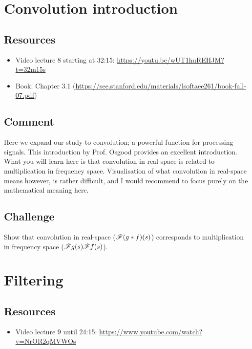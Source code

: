 \newpage
\section{Convolution introduction}

\subsection*{Resources}
\begin{itemize}
    \item Video lecture 8 starting at 32:15: \url{https://youtu.be/wUT1huREHJM?t=32m15s}
    \item Book: Chapter 3.1 (\url{https://see.stanford.edu/materials/lsoftaee261/book-fall-07.pdf})
\end{itemize}

\subsection*{Comment}
Here we expand our study to convolution; a powerful function for processing signals. This introduction by Prof. Osgood provides an excellent introduction. What you will learn here is that convolution in real space is related to multiplication in frequency space. Visualisation of what convolution in real-space means however, is rather difficult, and I would recommend to focus purely on the mathematical meaning here.

\subsection*{Challenge}
Show that convolution in real-space ($\mathscr{F}(g*f)(s)$) corresponds to multiplication in frequency space ($\mathscr{F} g(s) \mathscr{F} f(s)$).




\newpage
\section{Filtering}

\subsection*{Resources}
\begin{itemize}
    \item Video lecture 9 until 24:15: \url{https://www.youtube.com/watch?v=NrOR2qMVWOs}
\end{itemize}


